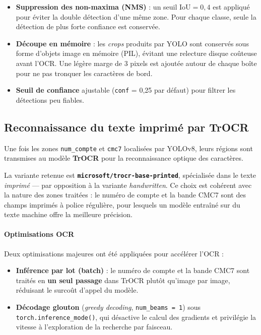 \begin{itemize}
    \item \textbf{Suppression des non-maxima (NMS)} : un seuil
    $\text{IoU} = 0{,}4$ est appliqué pour éviter la double détection d'une
    même zone. Pour chaque classe, seule la détection de plus forte
    confiance est conservée.
    \item \textbf{Découpe en mémoire} : les \textit{crops} produits par YOLO
    sont conservés sous forme d'objets image en mémoire (PIL), évitant une
    relecture disque coûteuse avant l'OCR. Une légère marge de 3 pixels est
    ajoutée autour de chaque boîte pour ne pas tronquer les caractères de
    bord.
    \item \textbf{Seuil de confiance} ajustable (\texttt{conf} = 0,25 par
    défaut) pour filtrer les détections peu fiables.
\end{itemize}

\subsection*{Reconnaissance du texte imprimé par TrOCR}

Une fois les zones \texttt{num\_compte} et \texttt{cmc7} localisées par
YOLOv8, leurs régions sont transmises au modèle \textbf{TrOCR} pour la
reconnaissance optique des caractères.

La variante retenue est \textbf{\texttt{microsoft/trocr-base-printed}},
spécialisée dans le texte \textit{imprimé} — par opposition à la variante
\textit{handwritten}. Ce choix est cohérent avec la nature des zones
traitées : le numéro de compte et la bande CMC7 sont des champs imprimés à
police régulière, pour lesquels un modèle entraîné sur du texte machine
offre la meilleure précision.

\paragraph{Optimisations OCR}

Deux optimisations majeures ont été appliquées pour accélérer l'OCR :

\begin{itemize}
    \item \textbf{Inférence par lot (batch)} : le numéro de compte et la
    bande CMC7 sont traités en \textbf{un seul passage} dans TrOCR plutôt
    qu'image par image, réduisant le surcoût d'appel du modèle.
    \item \textbf{Décodage glouton} (\textit{greedy decoding},
    \texttt{num\_beams = 1}) sous \texttt{torch.inference\_mode()}, qui
    désactive le calcul des gradients et privilégie la vitesse à
    l'exploration de la recherche par faisceau.
\end{itemize}

